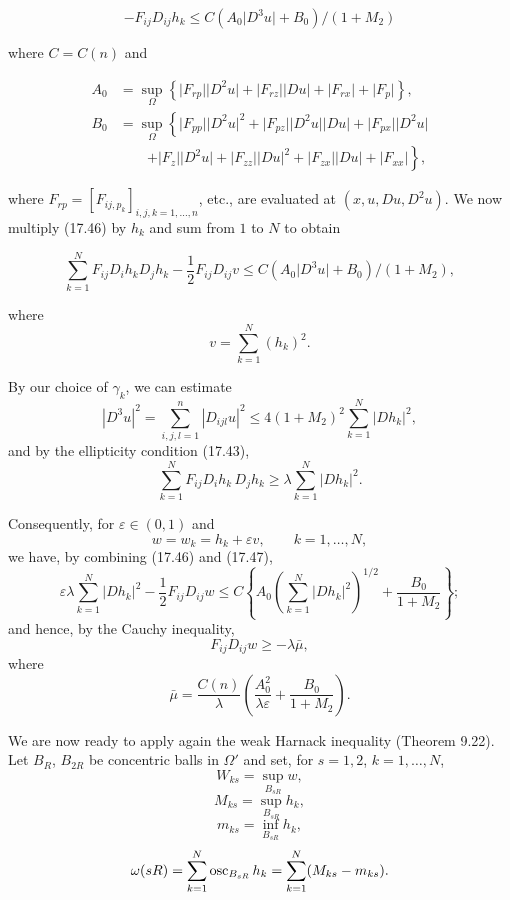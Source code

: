 \begin{equation}
-F_{ij}D_{ij}h_k \leq C(A_0\lvert D^3u\rvert + B_0)/(1 + M_2)
\end{equation}

where $C=C(n)$ and

\begin{align*}
A_0 &= \sup_{\Omega}\left\{\lvert F_{rp}\rvert \lvert D^2u\rvert + \lvert F_{rz}\rvert \lvert Du\rvert + \lvert F_{rx}\rvert + \lvert F_p\rvert\right\}, \\
B_0 &= \sup_{\Omega}\left\{\lvert F_{pp}\rvert \lvert D^2u\rvert^2 + \lvert F_{pz}\rvert \lvert D^2u\rvert \lvert Du\rvert + \lvert F_{px}\rvert \lvert D^2u\rvert \right. \\
&\qquad\left. + \lvert F_z\rvert \lvert D^2u\rvert + \lvert F_{zz}\rvert \lvert Du\rvert^2 + \lvert F_{zx}\rvert \lvert Du\rvert + \lvert F_{xx}\rvert\right\},
\end{align*}

where $F_{rp} = [F_{ij,p_k}]_{i,j,k=1,\dots,n}$, etc., are evaluated at $(x,u,Du,D^2u)$. We now multiply (17.46) by $h_k$ and sum from $1$ to $N$ to obtain

\begin{equation}
\sum_{k=1}^N F_{ij}D_i h_k D_j h_k - \frac12 F_{ij}D_{ij}v \leq C(A_0\lvert D^3u\rvert + B_0)/(1 + M_2),
\end{equation}



where
\[
v=\sum_{k=1}^N (h_k)^2.
\]

By our choice of $\gamma_k$, we can estimate
\[
|D^3u|^2=\sum_{i,j,l=1}^n |D_{ijl}u|^2
\le 4(1+M_2)^2 \sum_{k=1}^N |Dh_k|^2,
\]
and by the ellipticity condition (17.43),
\[
\sum_{k=1}^N F_{ij}D_i h_k\,D_j h_k \geq \lambda \sum_{k=1}^N |Dh_k|^2.
\]

Consequently, for $\varepsilon\in(0,1)$ and
\[
w=w_k=h_k+\varepsilon v,\qquad k=1,\dots,N,
\]
we have, by combining (17.46) and (17.47),
\[
\varepsilon\lambda\sum_{k=1}^N |Dh_k|^2-\frac12 F_{ij}D_{ij}w
\le C\left\{A_0\left(\sum_{k=1}^N |Dh_k|^2\right)^{1/2}+\frac{B_0}{1+M_2}\right\};
\]
and hence, by the Cauchy inequality,
\begin{equation}
\tag{17.48}
F_{ij}D_{ij}w\geq -\lambda \bar{\mu},
\end{equation}
where
\[
\bar{\mu}=\frac{C(n)}{\lambda}\left(\frac{A_0^2}{\lambda\varepsilon}+\frac{B_0}{1+M_2}\right).
\]

We are now ready to apply again the weak Harnack inequality (Theorem 9.22).
Let $B_R$, $B_{2R}$ be concentric balls in $\Omega'$ and set, for $s=1,2$, $k=1,\dots,N$,
\[
W_{ks}=\sup_{B_{sR}} w,
\]
\[
M_{ks}=\sup_{B_{sR}} h_k,
\]
\[
m_{ks}=\inf_{B_{sR}} h_k,
\]
\[
\omega(sR)=\sum_{k=1}^N \operatorname{osc}_{B_{sR}} h_k=\sum_{k=1}^N (M_{ks}-m_{ks}).
\]


